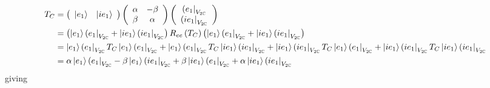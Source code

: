 \documentclass[aps,preprint]{revtex4}%
\begin{document}
\begin{align}
T_{C}  &  =\left(
\begin{array}
[c]{cc}%
\left\vert e_{1}\right\rangle  & \left\vert ie_{1}\right\rangle
\end{array}
\right)  \left(
\begin{array}
[c]{cc}%
\alpha & -\beta\\
\beta & \alpha
\end{array}
\right)  \left(
\begin{array}
[c]{c}%
\left(  e_{1}\right\vert _{V_{2\mathbb{C}}}\\
\left(  ie_{1}\right\vert _{V_{2\mathbb{C}}}%
\end{array}
\right) \\
&  =\left(  \left\vert e_{1}\right\rangle \left(  e_{1}\right\vert
_{V_{2\mathbb{C}}}+\left\vert ie_{1}\right\rangle \left(  ie_{1}\right\vert
_{V_{2\mathbb{C}}}\right)  R_{ee}\left(  T_{C}\right)  \left(  \left\vert
e_{1}\right\rangle \left(  e_{1}\right\vert _{V_{2\mathbb{C}}}+\left\vert
ie_{1}\right\rangle \left(  ie_{1}\right\vert _{V_{2\mathbb{C}}}\right) \\
&  =\left\vert e_{1}\right\rangle \left(  e_{1}\right\vert _{V_{2\mathbb{C}}%
}T_{C}\left\vert e_{1}\right\rangle \left(  e_{1}\right\vert _{V_{2\mathbb{C}%
}}+\left\vert e_{1}\right\rangle \left(  e_{1}\right\vert _{V_{2\mathbb{C}}%
}T_{C}\left\vert ie_{1}\right\rangle \left(  ie_{1}\right\vert
_{V_{2\mathbb{C}}}+\left\vert ie_{1}\right\rangle \left(  ie_{1}\right\vert
_{V_{2\mathbb{C}}}T_{C}\left\vert e_{1}\right\rangle \left(  e_{1}\right\vert
_{V_{2\mathbb{C}}}+\left\vert ie_{1}\right\rangle \left(  ie_{1}\right\vert
_{V_{2\mathbb{C}}}T_{C}\left\vert ie_{1}\right\rangle \left(  ie_{1}%
\right\vert _{V_{2\mathbb{C}}}\\
&  =\alpha\left\vert e_{1}\right\rangle \left(  e_{1}\right\vert
_{V_{2\mathbb{C}}}-\beta\left\vert e_{1}\right\rangle \left(  ie_{1}%
\right\vert _{V_{2\mathbb{C}}}+\beta\left\vert ie_{1}\right\rangle \left(
e_{1}\right\vert _{V_{2\mathbb{C}}}+\alpha\left\vert ie_{1}\right\rangle
\left(  ie_{1}\right\vert _{V_{2\mathbb{C}}}%
\end{align}
giving
\end{document}
